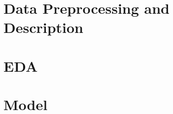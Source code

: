 \documentclass[a4paper,10pt]{extarticle}
\begin{document}
\section{Data Preprocessing and Description}

%
\section{EDA}

\section{Model}

\cleardoublepage
{}
{}

\end{document}
